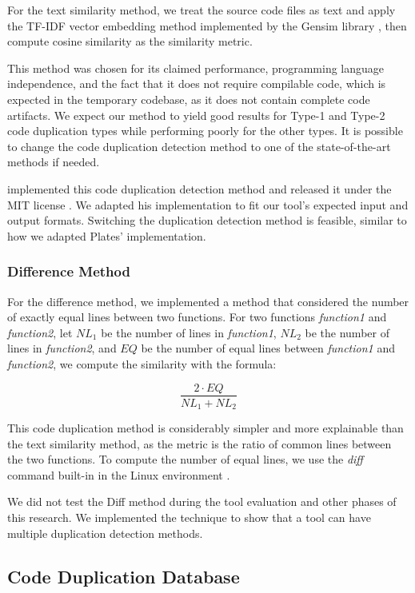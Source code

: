 For the text similarity method, we treat the source code files 
as text and apply the TF-IDF vector embedding method implemented by the 
Gensim library \citep{gensim}, then compute cosine similarity as the 
similarity metric.

This method was chosen for its claimed performance, 
programming language independence, and the fact that it does not require 
compilable code, which is expected in the temporary codebase, as it does 
not contain complete code artifacts. We expect our method to yield good 
results for Type-1 and Type-2 code duplication types while performing 
poorly for the other types. It is possible to change the code duplication 
detection method to one of the state-of-the-art methods if needed.

\cite{platistool} implemented this code duplication detection method and 
released it under the MIT license \citep{mitlicense}. We adapted his 
implementation to fit our tool's expected input and output formats. 
Switching the duplication detection method is feasible, similar to how 
we adapted Plates' implementation.

\subsubsection{Difference Method}

For the difference method, 
we implemented a method that considered the number of exactly equal lines between two functions.
For two functions \textit{function1} and \textit{function2}, let $NL_1$ be the number of lines in \textit{function1},
$NL_2$ be the number of lines in \textit{function2}, and $EQ$ be the number of equal lines between \textit{function1} and
\textit{function2}, we compute the similarity with the formula:

$$\frac{2 \cdot EQ}{NL_1 + NL_2}$$

This code duplication method is considerably simpler and more explainable than the text similarity method, 
as the metric is the ratio of common lines between the two functions. To compute the number of equal lines, we use
the \textit{diff} command built-in in the Linux environment \citep{diffcommand}.

We did not test the Diff method during the tool evaluation and other phases of this research. 
We implemented the technique to show that a tool can have multiple duplication detection methods.

\subsection{Code Duplication Database}


